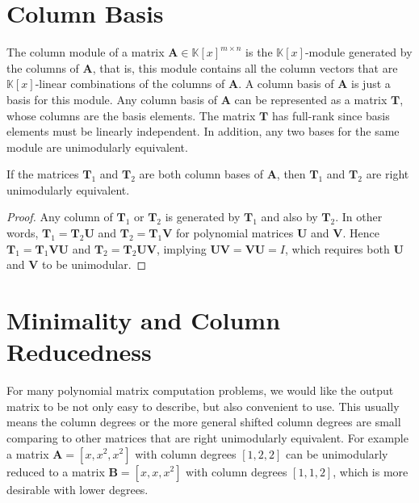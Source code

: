 \section{Column Basis}

The column module of a matrix $\mathbf{A}\in\mathbb{K}\left[x\right]^{m\times n}$
is the $\mathbb{K}\left[x\right]$-module generated by the columns
of $\mathbf{A}$, that is, this module contains all the column vectors
that are $\mathbb{K}\left[x\right]$-linear combinations of the columns
of $\mathbf{A}$. A column basis of $\mathbf{A}$ is just a basis
for this module. Any column basis of $\mathbf{A}$ can be represented
as a matrix $\mathbf{T}$, whose columns are the basis elements. The
matrix $\mathbf{T}$ has full-rank since basis elements must be linearly
independent. In addition, any two bases for the same module are unimodularly
equivalent.
\begin{lem}
\label{lem:basisEquivalence}If the matrices $\mathbf{T}_{1}$ and
$\mathbf{T}_{2}$ are both column bases of $\mathbf{A}$, then $\mathbf{T}_{1}$
and $\mathbf{T}_{2}$ are right unimodularly equivalent.\end{lem}
\begin{proof}
Any column of $\mathbf{T}_{1}$ or $\mathbf{T}_{2}$ is generated
by $\mathbf{T}_{1}$ and also by $\mathbf{T}_{2}$. In other words,
$\mathbf{T}_{1}=\mathbf{T}_{2}\mathbf{U}$ and $\mathbf{T}_{2}=\mathbf{T}_{1}\mathbf{V}$
for polynomial matrices $\mathbf{U}$ and $\mathbf{V}$. Hence $\mathbf{T}_{1}=\mathbf{T}_{1}\mathbf{V}\mathbf{U}$
and $\mathbf{T}_{2}=\mathbf{T}_{2}\mathbf{U}\mathbf{V}$, implying
$\mathbf{U}\mathbf{V}=\mathbf{V}\mathbf{U}=I$, which requires both
$\mathbf{U}$ and $\mathbf{V}$ to be unimodular.
\end{proof}

\section{\label{sec:minimality}Minimality and Column Reducedness}

For many polynomial matrix computation problems, we would like the
output matrix to be not only easy to describe, but also convenient
to use. This usually means the column degrees or the more general
shifted column degrees are small comparing to other matrices that
are right unimodularly equivalent. For example a matrix $\mathbf{A}=\left[x,x^{2},x^{2}\right]$
with column degrees $\left[1,2,2\right]$ can be unimodularly reduced
to a matrix $\mathbf{B}=\left[x,x,x^{2}\right]$ with column degrees
$\left[1,1,2\right]$, which is more desirable with lower degrees. 

